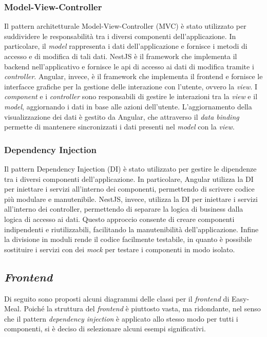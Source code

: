 \subsubsection{Model-View-Controller}

Il pattern architetturale Model-View-Controller (MVC) è stato utilizzato per
suddividere le responsabilità tra i diversi componenti dell'applicazione. In
particolare, il \textit{model} rappresenta i dati dell'applicazione e fornisce i
metodi di accesso e di modifica di tali dati. NestJS è il framework che
implementa il backend nell'applicativo e fornisce le api di accesso ai dati
di modifica tramite i \textit{controller}. Angular, invece, è il framework che
implementa il frontend e fornisce le interfacce grafiche per la gestione delle
interazione con l'utente, ovvero la \textit{view}. I \textit{component} e i
\textit{controller} sono responsabili di gestire le interazioni tra la 
\textit{view} e il \textit{model},
aggiornando i dati in base alle azioni dell'utente. L'aggiornamento della
visualizzazione dei dati è gestito da Angular, che attraverso il \textit{data
binding} permette di mantenere sincronizzati i dati presenti nel \textit{model}
con la \textit{view}.

\subsubsection{Dependency Injection}

Il pattern Dependency Injection (DI) è stato utilizzato per gestire le
dipendenze tra i diversi componenti dell'applicazione. In particolare, Angular
utilizza la DI per iniettare i servizi all'interno dei componenti, permettendo
di scrivere codice più modulare e manutenibile. NestJS, invece, utilizza la DI
per iniettare i servizi all'interno dei controller, permettendo di separare la
logica di business dalla logica di accesso ai dati. Questo approccio consente di
creare componenti indipendenti e riutilizzabili, facilitando la manutenibilità
dell'applicazione. Infine la divisione in moduli rende il codice facilmente
testabile, in quanto è possibile sostituire i servizi con dei \textit{mock} per
testare i componenti in modo isolato.

\subsection{\textit{Frontend}}

Di seguito sono proposti alcuni diagrammi delle classi per il \textit{frontend}
di Easy-Meal. Poiché la struttura del \textit{frontend} è piuttosto vasta, ma
ridondante, nel senso che il pattern \textit{dependency injection} è applicato
allo stesso modo per tutti i componenti, si è deciso di selezionare alcuni
esempi significativi.

